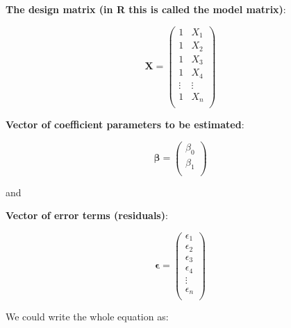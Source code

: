 \documentclass[12pt]{book}\usepackage[]{graphicx}\usepackage[]{color}
\begin{document}
\textbf{The design matrix (in R this is called the model matrix)}:

\begin{equation} \label{matrixsum}
\mathbf{X} = \left( \begin{array}{cc}
1 & X_1 \\
1 & X_2 \\
1 & X_3 \\
1 & X_4 \\
\vdots & \vdots \\
1 & X_n \\
\end{array} \right)
\end{equation}

\textbf{Vector of coefficient parameters to be estimated}:

\begin{equation} \label{matrixsum}
\mathbf{\beta} = \left( \begin{array}{c}
\beta_0 \\
\beta_1 \\
\end{array} \right)
\end{equation}

and 

\textbf{Vector of error terms (residuals)}:

\begin{equation} \label{matrixsum}
\mathbf{\epsilon} = \left( \begin{array}{c}
\epsilon_1 \\
\epsilon_2 \\
\epsilon_3 \\
\epsilon_4 \\
\vdots \\
\epsilon_n \\
\end{array} \right)
\end{equation}

We could write the whole equation as:
\end{document}

